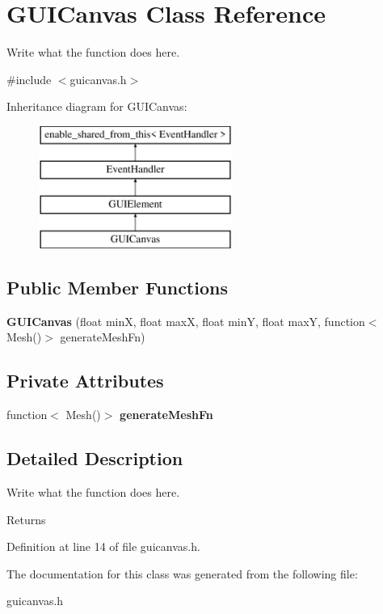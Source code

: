\hypertarget{classGUICanvas}{\section{G\+U\+I\+Canvas Class Reference}
\label{classGUICanvas}
}


Write what the function does here.  




{\ttfamily \#include $<$guicanvas.\+h$>$}

Inheritance diagram for G\+U\+I\+Canvas\+:\begin{figure}[H]
\begin{center}
\leavevmode
\includegraphics[height=4.000000cm]{classGUICanvas}
\end{center}
\end{figure}
\subsection*{Public Member Functions}
\begin{DoxyCompactItemize}
\item 
\hypertarget{classGUICanvas_a2e6418e2376d80fddab7a747dd15da36}{{\bfseries G\+U\+I\+Canvas} (float min\+X, float max\+X, float min\+Y, float max\+Y, function$<$ Mesh()$>$ generate\+Mesh\+Fn)}\label{classGUICanvas_a2e6418e2376d80fddab7a747dd15da36}

\end{DoxyCompactItemize}
\subsection*{Private Attributes}
\begin{DoxyCompactItemize}
\item 
\hypertarget{classGUICanvas_a3758be22090e23d9c7d566a5a08041d5}{function$<$ Mesh()$>$ {\bfseries generate\+Mesh\+Fn}}\label{classGUICanvas_a3758be22090e23d9c7d566a5a08041d5}

\end{DoxyCompactItemize}


\subsection{Detailed Description}
Write what the function does here. 

\begin{DoxyReturn}{Returns}

\end{DoxyReturn}


Definition at line 14 of file guicanvas.\+h.



The documentation for this class was generated from the following file\+:\begin{DoxyCompactItemize}
\item 
guicanvas.\+h\end{DoxyCompactItemize}
